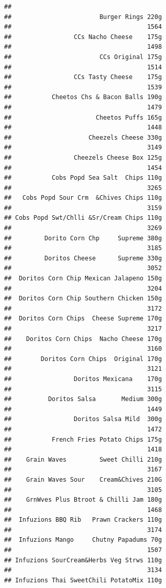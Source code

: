 \documentclass[
]{article}
\begin{document}
\begin{verbatim}
## 
##                        Burger Rings 220g 
##                                     1564 
##                 CCs Nacho Cheese    175g 
##                                     1498 
##                        CCs Original 175g 
##                                     1514 
##                 CCs Tasty Cheese    175g 
##                                     1539 
##           Cheetos Chs & Bacon Balls 190g 
##                                     1479 
##                       Cheetos Puffs 165g 
##                                     1448 
##                     Cheezels Cheese 330g 
##                                     3149 
##                 Cheezels Cheese Box 125g 
##                                     1454 
##           Cobs Popd Sea Salt  Chips 110g 
##                                     3265 
##   Cobs Popd Sour Crm  &Chives Chips 110g 
##                                     3159 
## Cobs Popd Swt/Chlli &Sr/Cream Chips 110g 
##                                     3269 
##         Dorito Corn Chp     Supreme 380g 
##                                     3185 
##         Doritos Cheese      Supreme 330g 
##                                     3052 
##  Doritos Corn Chip Mexican Jalapeno 150g 
##                                     3204 
##  Doritos Corn Chip Southern Chicken 150g 
##                                     3172 
##  Doritos Corn Chips  Cheese Supreme 170g 
##                                     3217 
##    Doritos Corn Chips  Nacho Cheese 170g 
##                                     3160 
##        Doritos Corn Chips  Original 170g 
##                                     3121 
##                 Doritos Mexicana    170g 
##                                     3115 
##          Doritos Salsa       Medium 300g 
##                                     1449 
##                 Doritos Salsa Mild  300g 
##                                     1472 
##           French Fries Potato Chips 175g 
##                                     1418 
##    Grain Waves         Sweet Chilli 210g 
##                                     3167 
##    Grain Waves Sour    Cream&Chives 210G 
##                                     3105 
##    GrnWves Plus Btroot & Chilli Jam 180g 
##                                     1468 
##  Infuzions BBQ Rib   Prawn Crackers 110g 
##                                     3174 
##  Infuzions Mango     Chutny Papadums 70g 
##                                     1507 
## Infuzions SourCream&Herbs Veg Strws 110g 
##                                     3134 
## Infuzions Thai SweetChili PotatoMix 110g 

\end{verbatim}
\end{document}
